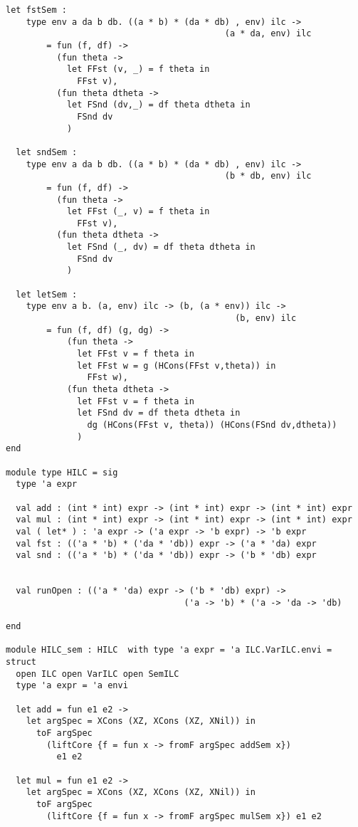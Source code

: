 \documentclass[uplatex]{sumiilab-paper}
\theoremstyle{mystyle}
\numberwithin{definition}{chapter} %
\begin{document}
\begin{lstlisting}[caption=ILCの埋め込み,label=src:ilc_unembedding]
  let fstSem : 
    type env a da b db. ((a * b) * (da * db) , env) ilc -> 
                                           (a * da, env) ilc 
        = fun (f, df) -> 
          (fun theta -> 
            let FFst (v, _) = f theta in 
              FFst v), 
          (fun theta dtheta -> 
            let FSnd (dv,_) = df theta dtheta in
              FSnd dv  
            )

  let sndSem : 
    type env a da b db. ((a * b) * (da * db) , env) ilc -> 
                                           (b * db, env) ilc 
        = fun (f, df) -> 
          (fun theta -> 
            let FFst (_, v) = f theta in 
              FFst v), 
          (fun theta dtheta -> 
            let FSnd (_, dv) = df theta dtheta in
              FSnd dv  
            )
    
  let letSem : 
    type env a b. (a, env) ilc -> (b, (a * env)) ilc -> 
                                             (b, env) ilc 
        = fun (f, df) (g, dg) -> 
            (fun theta -> 
              let FFst v = f theta in 
              let FFst w = g (HCons(FFst v,theta)) in 
                FFst w), 
            (fun theta dtheta -> 
              let FFst v = f theta in 
              let FSnd dv = df theta dtheta in 
                dg (HCons(FFst v, theta)) (HCons(FSnd dv,dtheta))
              )
end 

module type HILC = sig 
  type 'a expr 

  val add : (int * int) expr -> (int * int) expr -> (int * int) expr 
  val mul : (int * int) expr -> (int * int) expr -> (int * int) expr
  val ( let* ) : 'a expr -> ('a expr -> 'b expr) -> 'b expr  
  val fst : (('a * 'b) * ('da * 'db)) expr -> ('a * 'da) expr 
  val snd : (('a * 'b) * ('da * 'db)) expr -> ('b * 'db) expr 


  val runOpen : (('a * 'da) expr -> ('b * 'db) expr) -> 
                                   ('a -> 'b) * ('a -> 'da -> 'db)

end 

module HILC_sem : HILC  with type 'a expr = 'a ILC.VarILC.envi = 
struct 
  open ILC open VarILC open SemILC
  type 'a expr = 'a envi 

  let add = fun e1 e2 -> 
    let argSpec = XCons (XZ, XCons (XZ, XNil)) in 
      toF argSpec 
        (liftCore {f = fun x -> fromF argSpec addSem x}) 
          e1 e2 

  let mul = fun e1 e2 -> 
    let argSpec = XCons (XZ, XCons (XZ, XNil)) in 
      toF argSpec 
        (liftCore {f = fun x -> fromF argSpec mulSem x}) e1 e2


\end{lstlisting}
\end{document}
